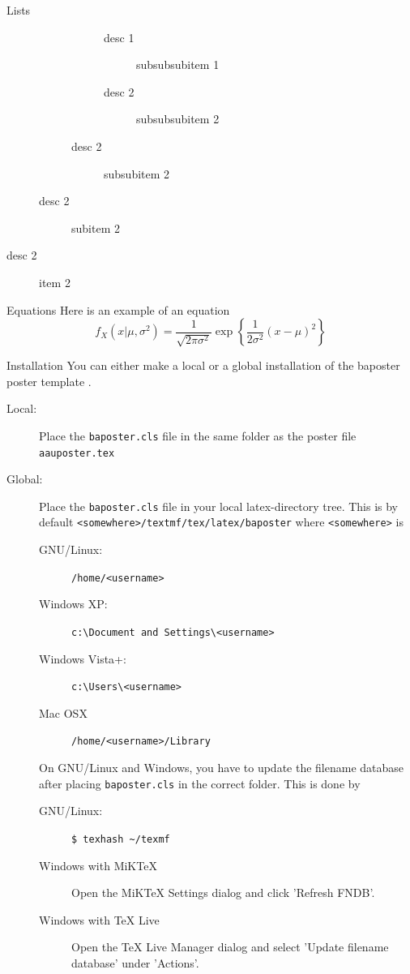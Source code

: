 \documentclass[a0paper,portrait]{baposter}
\begin{document}
\begin{poster}
\begin{posterbox}[name=lists,column=0,below=usage]{Lists}
\begin{description}
\begin{description}
\begin{description}
\begin{description}
              \item[desc 1] subsubsubitem 1
              \item[desc 2] subsubsubitem 2
            \end{description}
          \item[desc 2] subsubitem 2
        \end{description}
      \item[desc 2] subitem 2
    \end{description}
  \item[desc 2] item 2
\end{description}
\end{posterbox}

\begin{posterbox}[name=equation,column=0,below=lists,above=bottom]{Equations}
Here is an example of an equation
\begin{equation}
  f_X(x|\mu,\sigma^2) = \frac{1}{\sqrt{2\pi\sigma^2}}\exp\left\{\frac{1}{2\sigma^2}(x-\mu)^2\right\}
\end{equation}
\end{posterbox}

\begin{posterbox}[name=install,column=1,row=0]{Installation}
You can either make a local or a global installation of the baposter poster template \cite{baposter}.
\begin{description}
  \item[Local:] Place the {\tt baposter.cls} file in the same folder as the poster file {\tt aauposter.tex}
  \item[Global:] Place the {\tt baposter.cls} file in your local latex-directory tree. This is by default {\tt <somewhere>/textmf/tex/latex/baposter} where {\tt <somewhere>} is
  \begin{description}
    \item[GNU/Linux:] {\tt/home/<username>}
    \item[Windows XP:] {\tt c:\textbackslash Document and Settings\textbackslash<username>}
    \item[Windows Vista+:] {\tt c:\textbackslash Users\textbackslash<username>}
    \item[Mac OSX] {\tt/home/<username>/Library}
  \end{description}
  On GNU/Linux and Windows, you have to update the filename database after placing {\tt baposter.cls} in the correct folder. This is done by
  \begin{description}
    \item[GNU/Linux:] {\tt \$ texhash \textasciitilde /texmf}
    \item[Windows with MiKTeX] Open the MiKTeX Settings dialog and click 'Refresh FNDB'.
    \item[Windows with TeX Live] Open the TeX Live Manager dialog and select 'Update filename database' under 'Actions'.
  \end{description}
\end{description}
\end{posterbox}



\end{poster}
\end{document}
